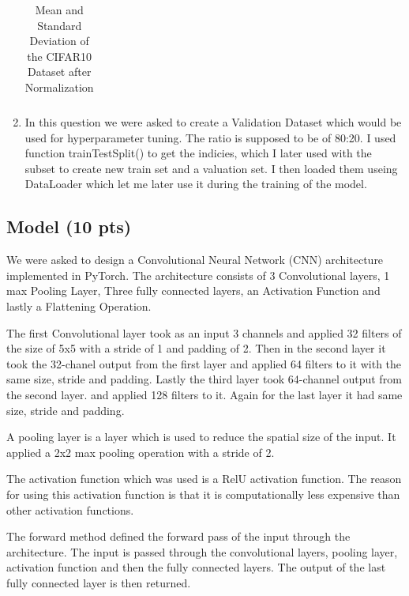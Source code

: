 \documentclass[a4paper]{article}
\begin{document}
\begin{enumerate}
\begin{table}[H]
\begin{tabular}{|l|l|l|}
			      \hline
		      \end{tabular}
		      \caption{Mean and Standard Deviation of the CIFAR10 Dataset after Normalization}
		      \label{tab:question1.1.4}
	      \end{table}



	\item In this question we were asked to create a Validation Dataset which would be used for hyperparameter tuning. The ratio is supposed to be of 80:20. I used function trainTestSplit() to get the indicies, which I later used with the subset to create new train set and a valuation set. I then loaded them useing DataLoader which let me later use it during the training of the model.


\end{enumerate}

\subsection{Model (10 pts)}
We were asked to design a Convolutional Neural Network (CNN) architecture implemented in PyTorch. The architecture consists of 3 Convolutional layers, 1 max Pooling Layer, Three fully connected layers, an Activation Function and lastly a Flattening Operation.

The first Convolutional layer took as an input 3 channels and applied 32 filters of the size of 5x5 with a stride of 1 and padding of 2. Then in the second layer it took the 32-chanel output from the first layer and applied 64 filters to it with the same size, stride and padding. Lastly the third layer took 64-channel output from the second layer. and applied 128 filters to it. Again for the last layer it had same size, stride and padding.

A pooling layer is a layer which is used to reduce the spatial size of the input. It applied a 2x2 max pooling operation with a stride of 2.

The activation function which was used is a RelU activation function. The reason for using this activation function is that it is computationally less expensive than other activation functions.

The forward method defined the forward pass of the input through the architecture. The input is passed through the convolutional layers, pooling layer, activation function and then the fully connected layers. The output of the last fully connected layer is then returned.
\end{document}
